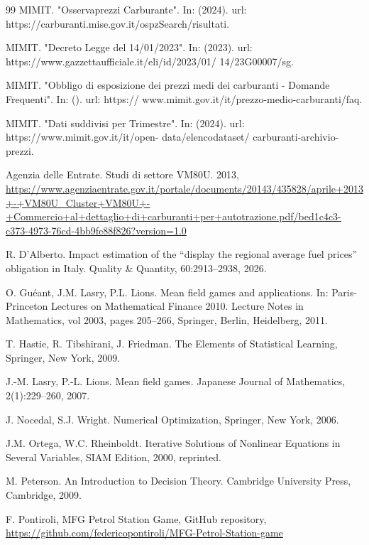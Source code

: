 \documentclass[graybox]{svmult}
\begin{document}
\begin{thebibliography}{99}
 MIMIT. "Osservaprezzi Carburante". In:
(2024). url: https://carburanti.mise.gov.it/ospzSearch/risultati.

 MIMIT. "Decreto Legge del 14/01/2023".
In: (2023). url: https://www.gazzettaufficiale.it/eli/id/2023/01/
14/23G00007/sg.

 MIMIT. "Obbligo di esposizione dei
prezzi medi dei carburanti - Domande Frequenti". In: (). url: https://
www.mimit.gov.it/it/prezzo-medio-carburanti/faq.

 MIMIT. "Dati suddivisi per Trimestre".
In: (2024). url: https://www.mimit.gov.it/it/open- data/elencodataset/
carburanti-archivio-prezzi.

 Agenzia delle Entrate. Studi di settore VM80U. 2013, \url{https://www.agenziaentrate.gov.it/portale/documents/20143/435828/aprile+2013+-+VM80U_Cluster+VM80U+-+Commercio+al+dettaglio+di+carburanti+per+autotrazione.pdf/bed1c4c3-c373-4973-76cd-4bb9fe88f826?version=1.0}

 R. D'Alberto. Impact estimation of the ``display the regional average fuel prices'' obligation in Italy. Quality \& Quantity, 60:2913--2938, 2026.

 O. Guéant, J.M. Lasry, P.L. Lions. Mean field games and applications.  In: Paris-Princeton Lectures on Mathematical Finance 2010. Lecture Notes in Mathematics, vol 2003, pages 205--266, Springer, Berlin, Heidelberg, 2011.

 T. Hastie, R. Tibshirani, J. Friedman. The Elements of Statistical Learning, Springer, New York, 2009.

 J.-M. Lasry, P.-L. Lions. Mean field games. Japanese Journal of Mathematics, 2(1):229--260, 2007.

 J. Nocedal, S.J. Wright. Numerical Optimization, Springer, New York, 2006.

 J.M. Ortega, W.C. Rheinboldt. Iterative Solutions of Nonlinear Equations in Several Variables, SIAM Edition, 2000, reprinted.

 M. Peterson. An Introduction to Decision Theory. Cambridge University Press, Cambridge, 2009.

 F. Pontiroli, MFG Petrol Station Game, GitHub repository, \url{https://github.com/federicopontiroli/MFG-Petrol-Station-game}

\end{thebibliography}
\end{document}
